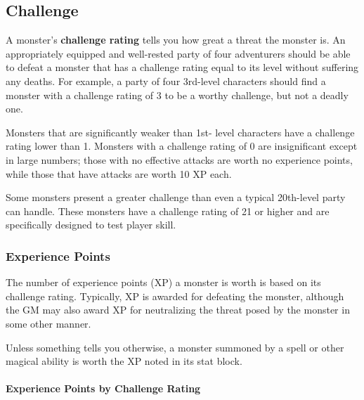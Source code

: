\documentclass[
]{article}
\begin{document}
\hypertarget{challenge}{%
\subsection{Challenge}\label{challenge}}

A monster's \textbf{challenge rating} tells you how great a threat the
monster is. An appropriately equipped and well-rested party of four
adventurers should be able to defeat a monster that has a challenge
rating equal to its level without suffering any deaths. For example, a
party of four 3rd-level characters should find a monster with a
challenge rating of 3 to be a worthy challenge, but not a deadly one.

Monsters that are significantly weaker than 1st- level characters have a
challenge rating lower than 1. Monsters with a challenge rating of 0 are
insignificant except in large numbers; those with no effective attacks
are worth no experience points, while those that have attacks are worth
10 XP each.

Some monsters present a greater challenge than even a typical 20th-level
party can handle. These monsters have a challenge rating of 21 or higher
and are specifically designed to test player skill.

\hypertarget{experience-points}{%
\subsubsection{Experience Points}\label{experience-points}}

The number of experience points (XP) a monster is worth is based on its
challenge rating. Typically, XP is awarded for defeating the monster,
although the GM may also award XP for neutralizing the threat posed by
the monster in some other manner.

Unless something tells you otherwise, a monster summoned by a spell or
other magical ability is worth the XP noted in its stat block.

\hypertarget{experience-points-by-challenge-rating}{%
\paragraph{Experience Points by Challenge
Rating}\label{experience-points-by-challenge-rating}}
\end{document}
